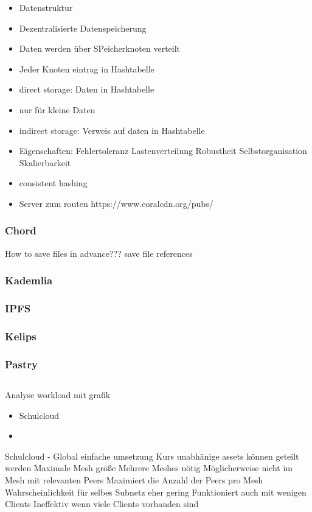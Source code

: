 \begin{itemize}
	\item Datenstruktur
	\item  Dezentralisierte Datenspeicherung
	\item Daten werden über SPeicherknoten verteilt
	\item Jeder Knoten eintrag in Hashtabelle
	\item direct storage: Daten in Hashtabelle
	\item nur für kleine Daten
	\item indirect storage: Verweis auf daten in Hashtabelle
	\item Eigenschaften:
Fehlertoleranz
Lastenverteilung
Robustheit
Selbstorganisation
Skalierbarkeit
	\item consistent hashing
	\item Server zum routen
https://www.coralcdn.org/pubs/
\end{itemize}






\subsubsection{Chord}

How to save files in advance???
save file references
\subsubsection{Kademlia}
\subsubsection{IPFS}
\subsubsection{Kelips}
\subsubsection{Pastry}
\subsection{\schulCloud}
Analyse workload mit grafik

\begin{itemize}
	\item Schulcloud
	\item 	
\end{itemize}
Schulcloud
- Global
einfache umsetzung
Kurs unabhänige assets können geteilt werden
Maximale Mesh größe
Mehrere Meshes nötig
Möglicherweise nicht im Mesh mit relevanten Peers
Maximiert die Anzahl der Peers pro Mesh
Wahrscheinlichkeit für selbes Subnetz eher gering
Funktioniert auch mit wenigen Clients
Ineffektiv wenn viele Clients vorhanden sind


